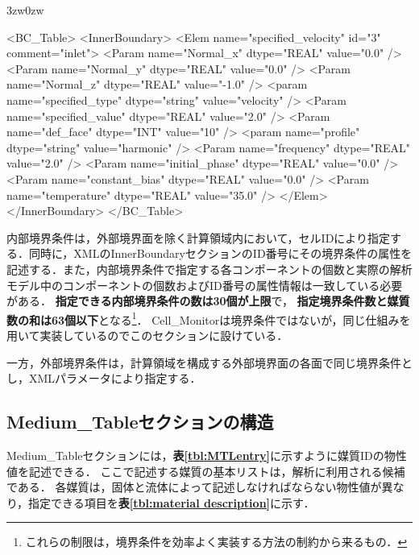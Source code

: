 \begin{indentation}{3zw}{0zw}
{ \small
\begin{program}
<BC_Table>
  <InnerBoundary>
      <Elem name="specified_velocity" id="3" comment="inlet">
        <Param name="Normal_x"        dtype="REAL"   value="0.0" />
        <Param name="Normal_y"        dtype="REAL"   value="0.0" />
        <Param name="Normal_z"        dtype="REAL"   value="-1.0" />
        <param name="specified_type"  dtype="string" value="velocity" />
        <Param name="specified_value" dtype="REAL"   value="2.0" />
        <Param name="def_face"        dtype="INT"    value="10" />
        <param name="profile"         dtype="string" value="harmonic" />
        <Param name="frequency"       dtype="REAL"   value="2.0" />
        <Param name="initial_phase"   dtype="REAL"   value="0.0" />
        <Param name="constant_bias"   dtype="REAL"   value="0.0" />
        <Param name="temperature"     dtype="REAL"   value="35.0" />
      </Elem>
  </InnerBoundary>
</BC_Table>
\end{program}
}
\end{indentation}

内部境界条件は，外部境界面を除く計算領域内において，セルIDにより指定する．同時に，XMLのInnerBoundaryセクションのID番号にその境界条件の属性を記述する．また，内部境界条件で指定する各コンポーネントの個数と実際の解析モデル中のコンポーネントの個数およびID番号の属性情報は一致している必要がある．
\textbf{指定できる内部境界条件の数は30個が上限}で，
\textbf{指定境界条件数と媒質数の和は63個以下}となる\footnote{これらの制限は，境界条件を効率よく実装する方法の制約から来るもの．}．
Cell\_Monitorは境界条件ではないが，同じ仕組みを用いて実装しているのでこのセクションに設けている．

一方，外部境界条件は，計算領域を構成する外部境界面の各面で同じ境界条件とし，XMLパラメータにより指定する．

%
\subsection{Medium\_Tableセクションの構造}
Medium\_Tableセクションには，\textbf{表\ref{tbl:MTLentry}}に示すように媒質IDの物性値を記述できる．
ここで記述する媒質の基本リストは，解析に利用される候補である．
各媒質は，固体と流体によって記述しなければならない物性値が異なり，指定できる項目を\textbf{表\ref{tbl:material description}}に示す．\\

